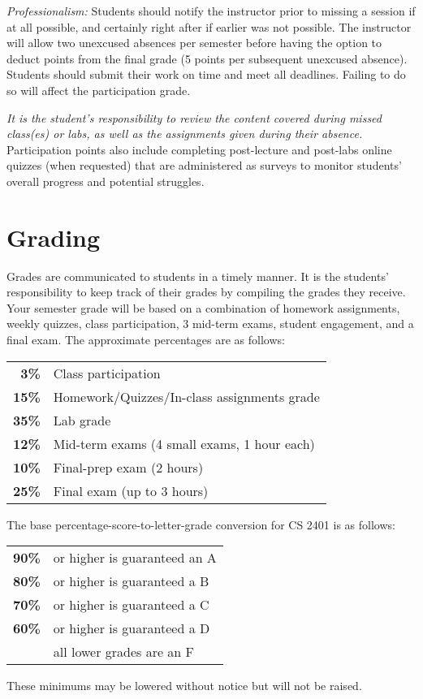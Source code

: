 \documentclass[12pt]{scrartcl}
\newcommand{\change}[2]{#2}
\begin{document}
\textit{Professionalism:} 
Students should notify the instructor prior to missing a session if at all possible, and certainly right after if earlier was not possible. 
The instructor will allow two unexcused absences per semester before having the option to deduct points from the final grade (5 points per subsequent unexcused absence). 
Students should submit their work on time and meet all deadlines. Failing to do so will affect the participation grade.

\textit{It is the student's responsibility to \change{obtain}{review} the content covered during missed class(es) or labs, as well as the assignments given during their absence.} 
Participation points also include completing post-lecture and post-labs online quizzes (when requested) that are administered as surveys to monitor students’ overall progress and potential struggles.


\section{Grading}

Grades are communicated to students in a timely manner. 
It is the students’ responsibility to keep track of their grades by compiling the grades they receive. 
Your semester grade will be based on a combination of homework assignments, weekly quizzes, class participation, 3 mid-term exams, student engagement, and a final exam. 
The approximate percentages are as follows:
\begin{center}
\begin{tabular}{rl}
\textbf{3\% } & Class participation \\
\textbf{15\% } & Homework/Quizzes/In-class assignments grade\\
\textbf{35\% } & Lab grade\\
\textbf{12\% } & Mid-term exams (4 small exams, 1 hour each) \\
\textbf{10\% } & Final-prep exam (2 hours)\\
\textbf{25\% } & Final exam (up to 3 hours)\\
\end{tabular}
\end{center}
The base percentage-score-to-letter-grade conversion for CS 2401 is as follows: 
\change{}{
\begin{center}
\begin{tabular}{rl}
\textbf{90\%}& or higher is guaranteed an A \\
\textbf{80\%}& or higher is guaranteed a B \\
\textbf{70\%}& or higher is guaranteed a C \\
\textbf{60\%}& or higher is guaranteed a D \\
\textbf{}& all lower grades are an F 
\end{tabular}
\end{center}
These minimums may be lowered without notice but will not be raised. 
}
\end{document}
